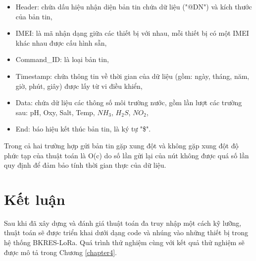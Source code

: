 \begin{itemize}
\item Header: chứa dấu hiệu nhận diện bản tin chứa dữ liệu ("@DN") và kích thước của bản tin,
\item IMEI: là mã nhận dạng giữa các thiết bị với nhau, mỗi thiết bị có một IMEI khác nhau được cấu hình sẵn,
\item Command\_ID: là loại bản tin,
\item Timestamp: chứa thông tin về thời gian của dữ liệu (gồm: ngày, tháng, năm, giờ, phút, giây) được lấy từ vi điều khiển,
\item Data: chứa dữ liệu các thông số môi trường nước, gồm lần lượt các trường sau: pH, Oxy, Salt, Temp, $NH_3$, $H_2S$, $NO_2$,
\item End: báo hiệu kết thúc bản tin, là ký tự "\$".
\end{itemize}
Trong cả hai trường hợp gửi bản tin gặp xung đột và không gặp xung đột độ phức tạp của thuật toán là O(c) do số lần gửi lại của nút không được quá số lần quy định để đảm bảo tính thời gian thực của dữ liệu.
\section{Kết luận}
Sau khi đã xây dựng và đánh giá thuật toán đa truy nhập một cách kỹ lưỡng, thuật toán sẽ được triển khai dưới dạng code và nhúng vào những thiết bị trong hệ thống BKRES-LoRa. Quá trình thử nghiệm cùng với kết quả thử nghiệm sẽ được mô tả trong Chương \ref{chapter4}{}.



